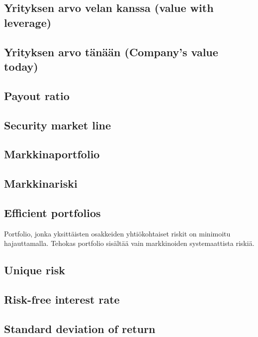 \documentclass[a4paper]{article}
\begin{document}
\subsection{Yrityksen arvo velan kanssa (value with leverage)}


\subsection{Yrityksen arvo tänään (Company's value today)}

\subsection{Payout ratio}

\subsection{Security market line}

\subsection{Markkinaportfolio}

\subsection{Markkinariski}

\subsection{Efficient portfolios}

Portfolio, jonka yksittäisten osakkeiden yhtiökohtaiset riskit on minimoitu hajauttamalla. Tehokas portfolio sisältää vain markkinoiden systemaattista riskiä.

\subsection{Unique risk}

\subsection{Risk-free interest rate}

\subsection{Standard deviation of return}
\end{document}
